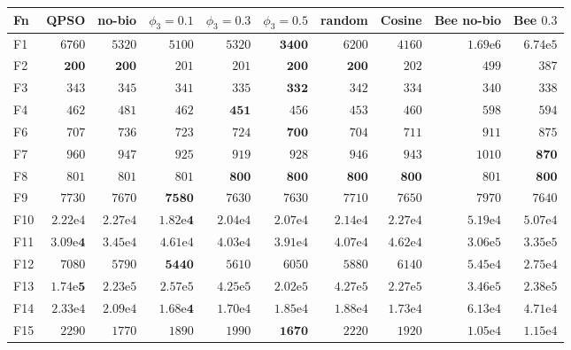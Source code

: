 \begin{tabular}{lrrrrrrrrr}
\toprule
Fn & QPSO & no-bio & $\phi_3{=}0.1$ & $\phi_3{=}0.3$ & $\phi_3{=}0.5$ & random & Cosine & Bee no-bio & Bee $0.3$ \\
\midrule
F1 & $6760$ & $5320$ & $5100$ & $5320$ & $\mathbf{3400}$ & $6200$ & $4160$ & $1.69\mathrm{e}{6}$ & $6.74\mathrm{e}{5}$ \\
F2 & $\mathbf{200}$ & $\mathbf{200}$ & $201$ & $201$ & $\mathbf{200}$ & $\mathbf{200}$ & $202$ & $499$ & $387$ \\
F3 & $343$ & $345$ & $341$ & $335$ & $\mathbf{332}$ & $342$ & $334$ & $340$ & $338$ \\
F4 & $462$ & $481$ & $462$ & $\mathbf{451}$ & $456$ & $453$ & $460$ & $598$ & $594$ \\
F6 & $707$ & $736$ & $723$ & $724$ & $\mathbf{700}$ & $704$ & $711$ & $911$ & $875$ \\
F7 & $960$ & $947$ & $925$ & $919$ & $928$ & $946$ & $943$ & $1010$ & $\mathbf{870}$ \\
F8 & $801$ & $801$ & $801$ & $\mathbf{800}$ & $\mathbf{800}$ & $\mathbf{800}$ & $\mathbf{800}$ & $801$ & $\mathbf{800}$ \\
F9 & $7730$ & $7670$ & $\mathbf{7580}$ & $7630$ & $7630$ & $7710$ & $7650$ & $7970$ & $7640$ \\
F10 & $2.22\mathrm{e}{4}$ & $2.27\mathrm{e}{4}$ & $\mathbf{1.82\mathrm{e}{4}}$ & $2.04\mathrm{e}{4}$ & $2.07\mathrm{e}{4}$ & $2.14\mathrm{e}{4}$ & $2.27\mathrm{e}{4}$ & $5.19\mathrm{e}{4}$ & $5.07\mathrm{e}{4}$ \\
F11 & $\mathbf{3.09\mathrm{e}{4}}$ & $3.45\mathrm{e}{4}$ & $4.61\mathrm{e}{4}$ & $4.03\mathrm{e}{4}$ & $3.91\mathrm{e}{4}$ & $4.07\mathrm{e}{4}$ & $4.62\mathrm{e}{4}$ & $3.06\mathrm{e}{5}$ & $3.35\mathrm{e}{5}$ \\
F12 & $7080$ & $5790$ & $\mathbf{5440}$ & $5610$ & $6050$ & $5880$ & $6140$ & $5.45\mathrm{e}{4}$ & $2.75\mathrm{e}{4}$ \\
F13 & $\mathbf{1.74\mathrm{e}{5}}$ & $2.23\mathrm{e}{5}$ & $2.57\mathrm{e}{5}$ & $4.25\mathrm{e}{5}$ & $2.02\mathrm{e}{5}$ & $4.27\mathrm{e}{5}$ & $2.27\mathrm{e}{5}$ & $3.46\mathrm{e}{5}$ & $2.38\mathrm{e}{5}$ \\
F14 & $2.33\mathrm{e}{4}$ & $2.09\mathrm{e}{4}$ & $\mathbf{1.68\mathrm{e}{4}}$ & $1.70\mathrm{e}{4}$ & $1.85\mathrm{e}{4}$ & $1.88\mathrm{e}{4}$ & $1.73\mathrm{e}{4}$ & $6.13\mathrm{e}{4}$ & $4.71\mathrm{e}{4}$ \\
F15 & $2290$ & $1770$ & $1890$ & $1990$ & $\mathbf{1670}$ & $2220$ & $1920$ & $1.05\mathrm{e}{4}$ & $1.15\mathrm{e}{4}$ \\

\end{tabular}
